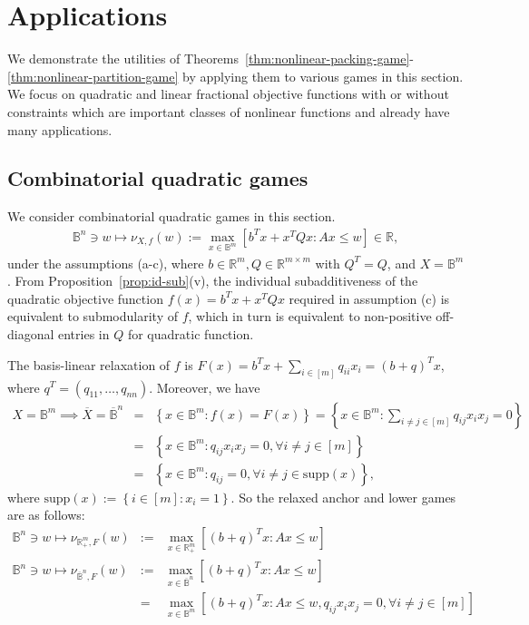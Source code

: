 \documentclass[11pt]{article}\usepackage[]{graphicx}\usepackage[]{xcolor}
\begin{document}
\section{Applications}\label{sec:apps}


We demonstrate the utilities of Theorems~\ref{thm:nonlinear-packing-game}-\ref{thm:nonlinear-partition-game} by applying them to various games in this section. We focus on quadratic and linear fractional objective functions with or without constraints which are important classes of nonlinear functions and already have many applications. 


\subsection{Combinatorial quadratic games}
We consider combinatorial quadratic games in this section. 
\begin{eqnarray}
\label{game:packing-subadditive-quadratic}\mathbb{B}^n\ni w\mapsto \nu_{X, f}(w):=\max\limits_{x\in \mathbb{B}^m} \left[b^Tx+x^TQx: Ax\le w\right]\in  \mathbb{R},
\end{eqnarray}
under the assumptions (a-c), where $b\in \mathbb{R}^m, Q\in \mathbb{R}^{m\times m}$ with $Q^T=Q$, and $X=\mathbb{B}^m$. From Proposition~\ref{prop:id-sub}(v), the individual subadditiveness of the quadratic objective function $f(x)=b^Tx+x^TQx$ required in assumption (c) is equivalent to submodularity of $f$, which in turn is equivalent to non-positive off-diagonal entries in $Q$ for quadratic function. 



The basis-linear relaxation of $f$ is $F(x)=b^Tx+\sum_{i\in [m]}q_{ii}x_i=(b+q)^Tx$, where $q^T=(q_{11},\dots, q_{nn})$. Moreover, we have
\begin{eqnarray*}
X=\mathbb{B}^m\implies \overline{X}=\overline{\mathbb{B}}^n&=&\left\{x\in \mathbb{B}^m: f(x)=F(x)\right\}=\left\{x\in\mathbb{B}^m: \sum_{i\ne j\in [m]}q_{ij}x_ix_j=0\right\}\\
&=&\left\{x\in \mathbb{B}^m: q_{ij}x_ix_j=0, \forall i\ne j\in [m]\right\}\\
&=&\left\{x\in \mathbb{B}^m: q_{ij}=0, \forall i\ne j\in \text{supp}(x)\right\},
\end{eqnarray*}
where $\text{supp}(x):=\left\{i\in [m]: x_i=1\right\}$. So the relaxed anchor and lower games are as follows: 
\begin{eqnarray*}
\mathbb{B}^n\ni w\mapsto \nu_{\mathbb{R}^m_{+},F}(w)&:=&\max\limits_{x\in \mathbb{R}^m_{+}} \left[(b+q)^Tx: Ax\le w\right]\\
\mathbb{B}^n\ni w\mapsto \nu_{\overline{\mathbb{B}}^n, F}(w)&:=&\max\limits_{x\in \overline{\mathbb{B}}^n} \left[(b+q)^Tx: Ax\le w\right]\\
&=&\max\limits_{x\in \mathbb{B}^m} \left[(b+q)^Tx: Ax\le w, q_{ij}x_ix_j=0, \forall i\ne j\in [m]\right]
\end{eqnarray*}
\end{document}
